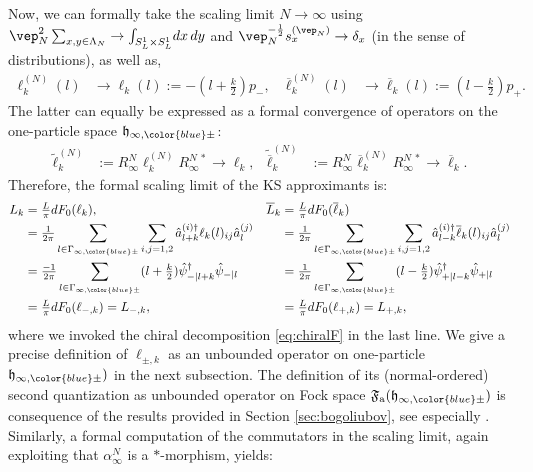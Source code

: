 \documentclass[a4paper, 11pt]{article}
\newcommand{\ua}{\textup a}
\newcommand{\fF}{\mathfrak{F}}\newcommand{\cF}{\mathcal{F}}\newcommand{\dF}{\mathds{F}}\newcommand{\sF}{\mathscr{F}}
\newcommand{\fh}{\mathfrak{h}}
\DeclareMathOperator{\1}{\mathds{1}}
\begin{document}
Now, we can formally take the scaling limit $N\rightarrow\infty$ using $\vep_{N}^{2}\sum_{x,y\in\Lambda_{N}}\rightarrow\int_{S^{1}_{L}\times S^{1}_{L}}\!dx\!\ dy$ and $\vep_{N}^{-\frac{1}{2}}s^{(\vep_{N})}_{x}\rightarrow\delta_{x}$ (in the sense of distributions), as well as,
\begin{align}
\label{eq:scalelim1pvira}
 \ell^{(N)}_{k}(l) & \rightarrow \ell_{k}(l) := -(l+\tfrac{k}{2})p_{-}, & \overline{\ell}^{(N)}_{k}(l) & \rightarrow \overline{\ell}_{k}(l) := (l-\tfrac{k}{2})p_{+}.
\end{align}
The latter can equally be expressed as a formal convergence of operators on the one-particle space $\fh_{\infty,{\color{blue}\pm}}$:
\begin{align}
\label{eq:latviraconv1pformal}
\tilde{\ell}^{(N)}_{k} & := R^{N}_{\infty}\ell^{(N)}_{k}R^{N\!\ *}_{\infty} \rightarrow \ell_{k}, & \tilde{\overline{\ell}}^{(N)}_{k} & := R^{N}_{\infty}\overline{\ell}^{(N)}_{k}R^{N\!\ *}_{\infty} \rightarrow \overline{\ell}_{k}.
\end{align}
Therefore, the formal scaling limit of the KS approximants is:
\begin{align}
\label{eq:scalelimvira}
L_{k} & = \tfrac{L}{\pi}dF_{0}(\ell_{k}), & \overline{L}_{k} & = \tfrac{L}{\pi}dF_{0}(\overline{\ell}_{k}) \\ \nonumber
& = \tfrac{1}{2\pi}\sum_{l\in\Gamma_{\infty,{\color{blue}\pm}}}\sum_{i,j=1,2}\hat{a}^{(i)\dag}_{l+k}\ell_{k}(l)_{ij}\hat{a}^{(j)}_{l} &
 & = \tfrac{1}{2\pi}\sum_{l\in\Gamma_{\infty,{\color{blue}\pm}}}\sum_{i,j=1,2}\hat{a}^{(i)\dag}_{l-k}\overline{\ell}_{k}(l)_{ij}\hat{a}^{(j)} _{l} \\ \nonumber
 & = \tfrac{-1}{2\pi}\sum_{l\in\Gamma_{\infty,{\color{blue}\pm}}}(l+\tfrac{k}{2})\hat{\psi}^{\dag}_{-|l+k}\hat{\psi}_{-|l} &  & = \tfrac{1}{2\pi}\sum_{l\in\Gamma_{\infty,{\color{blue}\pm}}}(l-\tfrac{k}{2})\hat{\psi}^{\dag}_{+|l-k}\hat{\psi}_{+|l} \\ \nonumber
 & = \tfrac{L}{\pi}dF_{0}(\ell_{-,k}) = L_{-,k}, &  & = \tfrac{L}{\pi}dF_{0}(\ell_{+,k}) = L_{+,k},
\end{align}
where we invoked the chiral decomposition \eqref{eq:chiralF} in the last line. We give a precise definition of $\ell_{\pm,k}$ as an unbounded operator on one-particle $\fh_{\infty,{\color{blue}\pm}})$ in the next subsection. The definition of its (normal-ordered) second quantization as unbounded operator on Fock space $\fF_{\ua}(\fh_{\infty,{\color{blue}\pm}})$ is consequence of the results provided in Section \ref{sec:bogoliubov}, see especially \cite{CareyOnFermionGauge}. Similarly, a formal computation of the commutators in the scaling limit, again exploiting that $\alpha^{N}_{\infty}$ is a $*$-morphism, yields:
\end{document}

